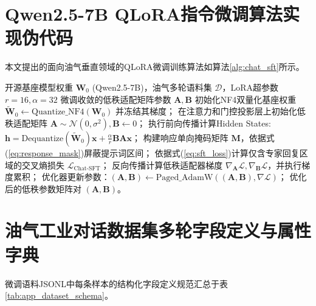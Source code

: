 \documentclass[UTF8,a4paper,zihao=-4,openany,twoside]{ctexbook}
\begin{document}
\chapter{Qwen2.5-7B QLoRA指令微调算法实现伪代码}
\label{app:code}

本文提出的面向油气垂直领域的QLoRA微调训练算法如算法\ref{alg:chat_sft}所示。

\begin{algorithm}[htbp]
\caption{面向油气工业知识发现的QLoRA指令微调算法 (Petro-QLoRA)}
\label{alg:chat_sft}
\begin{algorithmic}[1]
\REQUIRE 开源基座模型权重 $\mathbf{W}_0$ (Qwen2.5-7B)，油气多轮语料集 $\mathcal{D}$，LoRA超参数 $r=16, \alpha=32$
\ENSURE 微调收敛的低秩适配矩阵参数 $\mathbf{A}, \mathbf{B}$
\STATE 初始化NF4双量化基座权重 $\tilde{\mathbf{W}}_0 \leftarrow \text{Quantize\_NF4}(\mathbf{W}_0)$ 并冻结其梯度；
\STATE 在注意力和门控投影层上初始化低秩适配矩阵 $\mathbf{A} \sim \mathcal{N}(0, \sigma^2), \mathbf{B} \leftarrow 0$；
        \STATE 执行前向传播计算Hidden States: $\mathbf{h} = \text{Dequantize}(\tilde{\mathbf{W}}_0)\mathbf{x} + \frac{\alpha}{r}\mathbf{B}\mathbf{A}\mathbf{x}$；
        \STATE 构建响应单向掩码矩阵 $\mathbf{M}$，依据式(\ref{eq:response_mask})屏蔽提示词区间；
        \STATE 依据式(\ref{eq:sft_loss})计算仅含专家回复区域的交叉熵损失 $\mathcal{L}_{\text{Chat-SFT}}$；
        \STATE 反向传播计算低秩适配器梯度 $\nabla_{\mathbf{A}}\mathcal{L}, \nabla_{\mathbf{B}}\mathcal{L}$，并执行梯度累积；
        \STATE 优化器更新参数：$(\mathbf{A}, \mathbf{B}) \leftarrow \text{Paged\_AdamW}((\mathbf{A}, \mathbf{B}), \nabla \mathcal{L})$；
    \ENDFOR
\ENDFOR
\RETURN 优化后的低秩参数矩阵对 $(\mathbf{A}, \mathbf{B})$。
\end{algorithmic}
\end{algorithm}

\chapter{油气工业对话数据集多轮字段定义与属性字典}
\label{app:dataset_schema}

微调语料JSONL中每条样本的结构化字段定义规范汇总于表\ref{tab:app_dataset_schema}。
\end{document}
